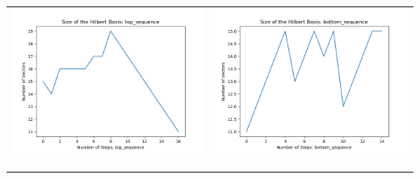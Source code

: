 \documentclass[10pt]{article}
\begin{document}
\begin{tabular}{c|c}
\begin{minipage}{.45\textwidth}
\includegraphics[width=\textwidth]{"DATA/4d/5 generators 2 bound D/top_sequence SIZE"}
\end{minipage} &
\begin{minipage}{.45\textwidth}
\includegraphics[width=\textwidth]{"DATA/4d/5 generators 2 bound D bottomup/bottom_sequence SIZE"}
\end{minipage} \\ \\
\hline \\\begin{minipage}{.45\textwidth}

\end{minipage}
\end{tabular}
\end{document}
